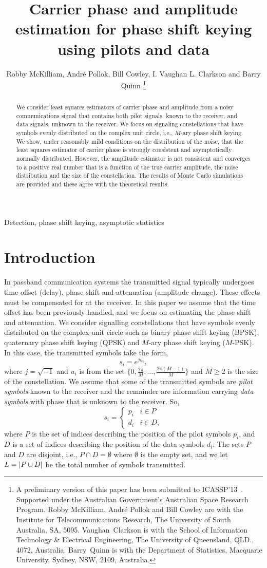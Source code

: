 \documentclass[draftcls, onecolumn, 11pt]{IEEEtran}
\title{Carrier phase and amplitude estimation for phase shift keying using pilots and data}
\author{Robby McKilliam, Andr\'{e} Pollok, Bill Cowley, I. Vaughan L. Clarkson and Barry Quinn  
\thanks{
A preliminary version of this paper has been submitted to ICASSP'13~\cite{McKilliam_leastsqPSKnoncoICASSP_2012}.  Supported under the Australian Government’s Australian Space Research Program.
Robby McKilliam, Andr\'{e} Pollok and Bill Cowley are with the Institute for Telecommunications Research, The University of South Australia, SA, 5095.  Vaughan~Clarkson is with the School of Information Technology \& Electrical Engineering, The University of Queensland, QLD., 4072, Australia.  Barry~Quinn is with the Department of Statistics, Macquarie University, Sydney, NSW, 2109, Australia.
}}
\begin{document}
\maketitle

\begin{abstract}
We consider least squares estimators of carrier phase and amplitude from a noisy communications signal that contains both pilot signals, known to the receiver, and data signals, unknown to the receiver.  We focus on signaling constellations that have symbols evenly distributed on the complex unit circle, i.e., $M$-ary phase shift keying.  We show, under reasonably mild conditions on the distribution of the noise, that the least squares estimator of carrier phase is strongly consistent and asymptotically normally distributed.  However, the amplitude estimator is not consistent and converges to a positive real number that is a function of the true carrier amplitude, the noise distribution and the size of the constellation.  %
The results of Monte Carlo simulations are provided and these agree with the theoretical results.   
\end{abstract}
\begin{IEEEkeywords}
Detection, phase shift keying, asymptotic statistics
\end{IEEEkeywords}

\section{Introduction}

In passband communication systems the transmitted signal typically undergoes time offset (delay), phase shift and attenuation (amplitude change).  These effects must be compensated for at the receiver. In this paper we assume that the time offset has been previously handled, and we focus on estimating the phase shift and attenuation.  We consider signalling constellations that have symbols evenly distributed on the complex unit circle such as binary phase shift keying (BPSK), quaternary phase shift keying (QPSK) and $M$-ary phase shift keying ($M$-PSK).  In this case, the transmitted symbols take the form,
\[
s_i = e^{j u_i},
\]
where $j = \sqrt{-1}$ and $u_i$ is from the set $\{0, \tfrac{2\pi}{M}, \dots, \tfrac{2\pi(M-1)}{M}\}$ and $M \geq 2$ is the size of the constellation.  We assume that some of the transmitted symbols are \emph{pilot symbols} known to the receiver and the remainder are information carrying \emph{data symbols} with phase that is unknown to the receiver.  So,
\[
s_i = \begin{cases}
p_i & i \in P \\
d_i & i \in D,
\end{cases}
\]
where $P$ is the set of indices describing the position of the pilot symbols $p_i$, and $D$ is a set of indices describing the position of the data symbols $d_i$.  The sets $P$ and $D$ are disjoint, i.e., $P \cap D = \emptyset$  where $\emptyset$ is the empty set, and we let $L = {\left\vert P \cup D \right\vert}$ be the total number of symbols transmitted.
\end{document}
